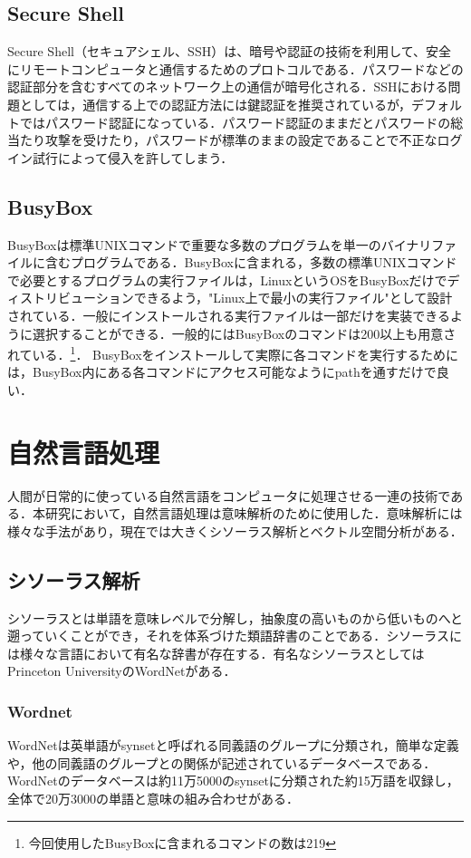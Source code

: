 \subsection{Secure Shell}
\label{tech:Secure Shell}
Secure Shell（セキュアシェル、SSH）は、暗号や認証の技術を利用して、安全にリモートコンピュータと通信するためのプロトコルである．パスワードなどの認証部分を含むすべてのネットワーク上の通信が暗号化される．\cite{ssh}SSHにおける問題としては，通信する上での認証方法には鍵認証を推奨されているが，デフォルトではパスワード認証になっている．パスワード認証のままだとパスワードの総当たり攻撃を受けたり，パスワードが標準のままの設定であることで不正なログイン試行によって侵入を許してしまう．

\subsection{BusyBox}
\label{tech:BusyBox}
BusyBoxは標準UNIXコマンドで重要な多数のプログラムを単一のバイナリファイルに含むプログラムである．BusyBoxに含まれる，多数の標準UNIXコマンドで必要とするプログラムの実行ファイルは，LinuxというOSをBusyBoxだけでディストリビューションできるよう，"Linux上で最小の実行ファイル"として設計されている．一般にインストールされる実行ファイルは一部だけを実装できるように選択することができる．一般的にはBusyBoxのコマンドは200以上も用意されている．\cite{busybox}\footnote{今回使用したBusyBoxに含まれるコマンドの数は219}．
BusyBoxをインストールして実際に各コマンドを実行するためには，BusyBox内にある各コマンドにアクセス可能なようにpathを通すだけで良い．

\section{自然言語処理}
\label{tech:NLP}
人間が日常的に使っている自然言語をコンピュータに処理させる一連の技術である．本研究において，自然言語処理は意味解析のために使用した．意味解析には様々な手法があり，現在では大きくシソーラス解析とベクトル空間分析がある．

\subsection{シソーラス解析}
\label{tech:Siso}
シソーラスとは単語を意味レベルで分解し，抽象度の高いものから低いものへと遡っていくことができ，それを体系づけた類語辞書のことである．シソーラスには様々な言語において有名な辞書が存在する．有名なシソーラスとしてはPrinceton UniversityのWordNetがある．\cite{wordnet}

\subsubsection{Wordnet}
\label{tech:Wordnet}
WordNetは英単語がsynsetと呼ばれる同義語のグループに分類され，簡単な定義や，他の同義語のグループとの関係が記述されているデータベースである．WordNetのデータベースは約11万5000のsynsetに分類された約15万語を収録し，全体で20万3000の単語と意味の組み合わせがある．\cite{wordnetwiki}

